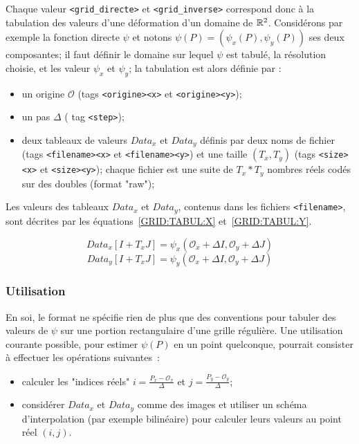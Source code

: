 Chaque valeur {\tt <grid\_directe>} et {\tt <grid\_inverse>}  correspond
donc \`a la tabulation des valeurs d'une d\'eformation d'un domaine de $\RR^2$.
Consid\'erons par exemple la fonction directe $\psi$ et notons
$\psi(P)= (\psi_x(P),\psi_y(P))$ ses deux composantes; il faut d\'efinir le
domaine sur lequel $\psi$ est tabul\'e, la r\'esolution choisie, et les
valeur $\psi_x$ et $\psi_y$; la tabulation est alors d\'efinie par :

\begin{itemize}
    \item un origine $\mathcal{O}$ (tags {\tt <origine><x>} et {\tt <origine><y>});
    \item un pas $\Delta$ ( tag {\tt <step>}); 
    \item deux  tableaux de valeurs $Data_x$ et $Data_y$  d\'efinis
          par  deux noms de fichier (tags {\tt <filename><x>}  
          et {\tt <filename><y>}) et une taille  $(T_x,T_y)$
          (tags {\tt <size><x>} et {\tt <size><y>});
          chaque fichier est une suite de  $T_x*T_y$ nombres r\'eels cod\'es sur des
          doubles (format "raw");
\end{itemize}

Les valeurs des tableaux $Data_x$ et  $Data_y$, contenus dans les fichiers 
{\tt <filename>}, sont d\'ecrites par les \'equations~\ref{GRID:TABUL:X}
et~\ref{GRID:TABUL:Y}.

\begin{equation}
   Data_x[I+T_x J] = \psi_x(\mathcal{O}_x+\Delta I,\mathcal{O}_y+\Delta J)
   \label{GRID:TABUL:X}
\end{equation}
\begin{equation}
   Data_y[I+T_x J] = \psi_y(\mathcal{O}_x+\Delta I,\mathcal{O}_y+\Delta J)
   \label{GRID:TABUL:Y}
\end{equation}

\subsubsection{Utilisation}

\label{Util:Grid}

En soi, le format  ne sp\'ecifie rien de plus que des conventions
pour tabuler des valeurs
de  $\psi$ sur une portion rectangulaire d'une  grille  r\'eguli\`ere.
Une utilisation courante possible, pour estimer $\psi(P)$ en un point quelconque,
pourrait consister \`a effectuer les op\'erations suivantes~:

\begin{itemize}
   \item calculer les "indices r\'eels" $i=\frac{P_x-\mathcal{O}_x}{\Delta}$
         et $j=\frac{P_y-\mathcal{O}_y}{\Delta}$;
    \item consid\'erer $Data_x$ et $Data_y$ comme des images et utiliser
           un sch\'ema d'interpolation (par exemple bilin\'eaire) pour
           calculer leurs valeurs au point r\'eel $(i,j)$.
\end{itemize}


